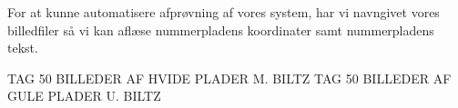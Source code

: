 For at kunne automatisere afprøvning af vores system, har vi navngivet vores billedfiler så vi kan aflæse nummerpladens koordinater samt nummerpladens tekst. 

TAG 50 BILLEDER AF HVIDE PLADER M. BILTZ
TAG 50 BILLEDER AF GULE PLADER U. BILTZ

